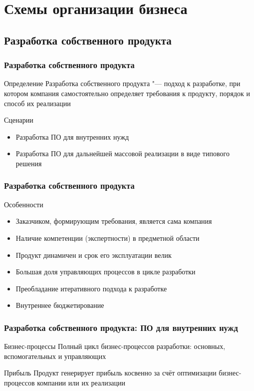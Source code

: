 \documentclass{../industrial-development}
\begin{document}
\section{Схемы организации бизнеса}

\subsection{Разработка собственного продукта}


\begin{frame} \frametitle{Разработка собственного продукта}
	\begin{block}{Определение}
		\alert{Разработка собственного продукта} "--- подход к разработке, при котором компания самостоятельно определяет требования к продукту, порядок и способ их реализации
	\end{block}
	\begin{block}{Сценарии}
		\begin{itemize}
			\item Разработка ПО для внутренних нужд
			\item Разработка ПО для дальнейшей массовой реализации в виде типового решения
		\end{itemize}
	\end{block}
\end{frame}
\lecturenotes


\begin{frame} \frametitle{Разработка собственного продукта}
	\begin{block}{Особенности}
		\begin{itemize}
			\item Заказчиком, формирующим требования, является сама компания
			\item Наличие компетенции (экспертности) в предметной области
			\item Продукт динамичен и срок его эксплуатации велик
			\item Большая доля управляющих процессов в цикле разработки
			\item Преобладание итеративного подхода к разработке
			\item Внутреннее бюджетирование
		\end{itemize}
	\end{block}
\end{frame}
\lecturenotes


\begin{frame} \frametitle{Разработка собственного продукта: ПО для внутренних нужд}
	\begin{block}{Бизнес-процессы}
		Полный цикл бизнес-процессов разработки: основных, вспомогательных и управляющих
	\end{block}
	\begin{block}{Прибыль}
		Продукт генерирует прибыль косвенно за счёт оптимизации бизнес-процессов компании или их реализации
	\end{block}
\end{frame}
\lecturenotes
\end{document}
